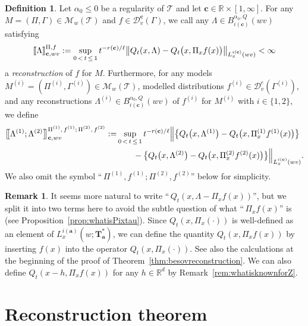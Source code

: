 \documentclass[10pt]{amsart}
\theoremstyle{definition}
\newtheorem{defi}[theo]{Definition}
\newtheorem{rema}[theo]{Remark}
\numberwithin{equation}{section}
\newcommand{\bbR}{\mathbb{R}}
\newcommand{\bfa}{\mathbf{a}}
\newcommand{\bfc}{\mathbf{c}}
\newcommand{\bfT}{\mathbf{T}}
\newcommand{\mcD}{\mathcal{D}}
\newcommand{\scT}{\mathscr{T}}
\newcommand{\scM}{\mathscr{M}}
\newcommand{\llbracket}{\mathopen{[\mkern -2.7mu[}}
\newcommand{\rrbracket}{\mathclose{]\mkern -2.7mu]}}
\newcommand{\lb}{\llbracket}
\newcommand{\rb}{\rrbracket}
\newcommand{\llbigbracket}{\mathopen{\big[\mkern -4.2mu\big[}}
\newcommand{\rrbigbracket}{\mathclose{\big]\mkern -4.2mu\big]}}
\newcommand{\lbb}{\llbigbracket}
\newcommand{\rbb}{\rrbigbracket}
\begin{document}
\begin{defi}\label{def:besovreconst}
Let $\alpha_0\le0$ be a regularity of $\scT$ and let $\bfc\in\bbR\times[1,\infty]$. For any $M=(\Pi,\Gamma)\in\scM_{w}(\scT)$ and $f\in\mcD_{v}^\bfc(\Gamma)$, we call any $\Lambda\in B_{i(\bfc)}^{\alpha_0,Q}(wv)$ satisfying
\begin{align*}
\lb\Lambda\rb_{\bfc,wv}^{\Pi,f}:=\sup_{0\,<\,t\,\le\,1}t^{-r(\bfc)/\ell}\big\|Q_t(x,\Lambda)-Q_t\big(x,\Pi_xf(x)\big)\big\|_{L_x^{i(\bfc)}(wv)}<\infty
\end{align*}
a \emph{reconstruction} of $f$ for $M$. Furthermore, for any models $M^{(i)}=(\Pi^{(i)},\Gamma^{(i)})\in\scM_{w}(\scT)$, modelled distributions $f^{(i)}\in\mcD_{v}^e(\Gamma^{(i)})$, and any reconstructions $\Lambda^{(i)}\in B_{i(\bfc)}^{\alpha_0,Q}(wv)$ of $f^{(i)}$ for $M^{(i)}$ with $i\in\{1,2\}$, we define
\begin{align*}
\lbb\Lambda^{(1)};\Lambda^{(2)}\rbb_{\bfc,wv}^{\Pi^{(1)},\,f^{(1)};\,\Pi^{(2)},\,f^{(2)}} :=&\sup_{0\,<\,t\,\le\,1}t^{-r(\bfc)/\ell}\Big\|\big\{Q_t\big(x,\Lambda^{(1)}\big)-Q_t\big(x,\Pi_x^{(1)}f^{(1)}(x)\big)\big\}\\
&\qquad-\big\{Q_t\big(x,\Lambda^{(2)}\big)-Q_t\big(x,\Pi_x^{(2)}f^{(2)}(x)\big)\big\}\Big\|_{L_x^{i(\bfc)}(wv)}.
\end{align*}
We also omit the symbol ``$\,\Pi^{(1)},f^{(1)};\Pi^{(2)},f^{(2)}$'' below for simplicity.
\end{defi}

\begin{rema}\label{rem:L-Pixfx}
It seems more natural to write ``$\, Q_t(x,\Lambda-\Pi_xf(x))$'', but we split it into two terms here to avoid the subtle question of what ``$\, \Pi_xf(x)$'' is (see Proposition~\ref{prop:whatisPixtau}). Since $Q_t(x,\Pi_x(\cdot))$ is well-defined as an element of $L_x^{i(\bfa)}(w;\bfT_\bfa^*)$, we can define the quantity $Q_t(x,\Pi_xf(x))$ by inserting $f(x)$ into the operator $Q_t(x,\Pi_x(\cdot))$. See also the calculations at the beginning of the proof of Theorem~\ref{thm:besovreconstruction}. We can also define $Q_t(x-h,\Pi_xf(x))$ for any $h\in\bbR^d$ by Remark~\ref{rem:whatisknownforZ}.
\end{rema}

\section{Reconstruction theorem}\label{section:reconstruction}
\end{document}
